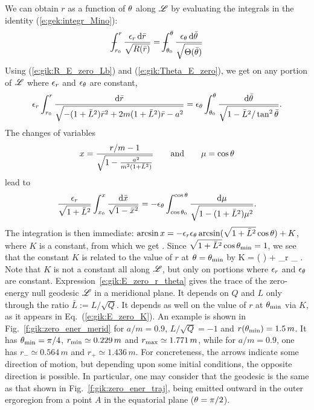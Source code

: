 We can obtain $r$ as a function of $\theta$ along $\mathscr{L}$ by evaluating the integrals
in the identity (\ref{e:gek:integr_Mino}):
\[
    \dashint_{r_0}^r \frac{\eps_r \, \D \bar{r}}{\sqrt{R(\bar{r})}}
   = \dashint_{\th_0}^\th \frac{\eps_\th \, \D \bar{\th}}{\sqrt{\Theta(\bar{\th})}}
\]
Using (\ref{e:gik:R_E_zero_Lb}) and (\ref{e:gik:Theta_E_zero}), we get on
any portion of $\mathscr{L}$ where $\epsilon_r$ and $\epsilon_\theta$ are constant,
\[
    \epsilon_r \int_{r_0}^r
    \frac{\mathrm{d} \bar{r}}{\sqrt{- (1 + \bar{L}^2) \bar{r}^2 + 2m (1 + \bar{L}^2) \bar{r} - a^2}}
    = \epsilon_\theta \int_{\theta_0}^\theta \frac{\mathrm{d} \bar{\theta}}{\sqrt{1 - \bar{L}^2/\tan^2\bar{\theta}}} .
\]
The changes of variables
\[
    x = \frac{r/m - 1}{\sqrt{1 - \frac{a^2}{m^2(1 + \bar{L}^2)}}}
    \qquad\mbox{and}\qquad
    \mu = \cos\theta
\]
lead to
\[
   \frac{\epsilon_r}{\sqrt{1 + \bar{L}^2}} \int_{x_0}^x \frac{\mathrm{d}\bar{x}}{\sqrt{1 - \bar{x}^2}}
   = - \epsilon_\theta \int_{\cos\theta_0}^{\cos\theta} \frac{\mathrm{d}\mu}{\sqrt{1 - (1 + \bar{L}^2)\mu^2}} .
\]
The integration is then immediate:
$\arcsin x = - \epsilon_r \epsilon_\theta \arcsin(\sqrt{1 + \bar{L}^2} \cos\theta) + K$,
where $K$ is a constant, from which we get
\be \label{e:gik:E_zero_r_theta}
   .
\ee
Since $\sqrt{1 + \bar{L}^2} \cos\theta_{\rm min} = 1$, we see that the constant
$K$ is related to the value of $r$ at $\theta = \theta_{\rm min}$ by
\be \label{e:gik:E_zero_K}
    K =  \arcsin \left(  \right)
    + \eps_r \eps_\th {} .
\ee
Note that $K$ is not a constant all along $\mathscr{L}$, but only on portions where
$\epsilon_r$ and $\epsilon_\theta$ are constant.
Expression~\ref{e:gik:E_zero_r_theta} gives the trace of the zero-energy
null geodesic $\mathscr{L}$ in a meridional plane. It depends on $Q$ and $L$ only
through the ratio $\bar{L} := L / \sqrt{Q}$. It depends as well on the value of
$r$ at $\theta_{\rm min}$ via $K$, as it appears in Eq.~(\ref{e:gik:E_zero_K}).
An example is shown in Fig.~\ref{f:gik:zero_ener_merid} for $a/m = 0.9$, $L / \sqrt{Q} = -1$
and $r(\theta_{\rm min}) = 1.5\, m$. It has $\theta_{\rm min} = \pi/4$,
$r_{\rm min} \simeq 0.229\, m$ and $r_{\rm max} \simeq 1.771\, m$,
while for $a/m = 0.9$, one has $r_- \simeq 0.564\, m$ and $r_+ \simeq 1.436\, m$.
For concreteness, the arrows indicate some direction of motion, but depending upon some
initial conditions, the opposite direction is possible.
In particular, one may consider that the geodesic is the same as that shown
in Fig.~\ref{f:gik:zero_ener_traj}, being emitted outward in the outer ergoregion
from a point $A$ in the equatorial plane ($\theta=\pi/2$).

